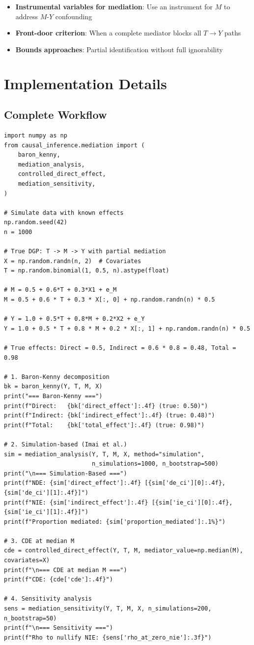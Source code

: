 \begin{itemize}
\item \textbf{Instrumental variables for mediation}: Use an instrument for $M$ to address $M$-$Y$ confounding
\item \textbf{Front-door criterion}: When a complete mediator blocks all $T \to Y$ paths
\item \textbf{Bounds approaches}: Partial identification without full ignorability
\end{itemize}


\section{Implementation Details}

\subsection{Complete Workflow}

\begin{verbatim}
import numpy as np
from causal_inference.mediation import (
    baron_kenny,
    mediation_analysis,
    controlled_direct_effect,
    mediation_sensitivity,
)

# Simulate data with known effects
np.random.seed(42)
n = 1000

# True DGP: T -> M -> Y with partial mediation
X = np.random.randn(n, 2)  # Covariates
T = np.random.binomial(1, 0.5, n).astype(float)

# M = 0.5 + 0.6*T + 0.3*X1 + e_M
M = 0.5 + 0.6 * T + 0.3 * X[:, 0] + np.random.randn(n) * 0.5

# Y = 1.0 + 0.5*T + 0.8*M + 0.2*X2 + e_Y
Y = 1.0 + 0.5 * T + 0.8 * M + 0.2 * X[:, 1] + np.random.randn(n) * 0.5

# True effects: Direct = 0.5, Indirect = 0.6 * 0.8 = 0.48, Total = 0.98

# 1. Baron-Kenny decomposition
bk = baron_kenny(Y, T, M, X)
print("=== Baron-Kenny ===")
print(f"Direct:   {bk['direct_effect']:.4f} (true: 0.50)")
print(f"Indirect: {bk['indirect_effect']:.4f} (true: 0.48)")
print(f"Total:    {bk['total_effect']:.4f} (true: 0.98)")

# 2. Simulation-based (Imai et al.)
sim = mediation_analysis(Y, T, M, X, method="simulation",
                         n_simulations=1000, n_bootstrap=500)
print("\n=== Simulation-Based ===")
print(f"NDE: {sim['direct_effect']:.4f} [{sim['de_ci'][0]:.4f}, {sim['de_ci'][1]:.4f}]")
print(f"NIE: {sim['indirect_effect']:.4f} [{sim['ie_ci'][0]:.4f}, {sim['ie_ci'][1]:.4f}]")
print(f"Proportion mediated: {sim['proportion_mediated']:.1%}")

# 3. CDE at median M
cde = controlled_direct_effect(Y, T, M, mediator_value=np.median(M), covariates=X)
print(f"\n=== CDE at median M ===")
print(f"CDE: {cde['cde']:.4f}")

# 4. Sensitivity analysis
sens = mediation_sensitivity(Y, T, M, X, n_simulations=200, n_bootstrap=50)
print(f"\n=== Sensitivity ===")
print(f"Rho to nullify NIE: {sens['rho_at_zero_nie']:.3f}")
\end{verbatim}



